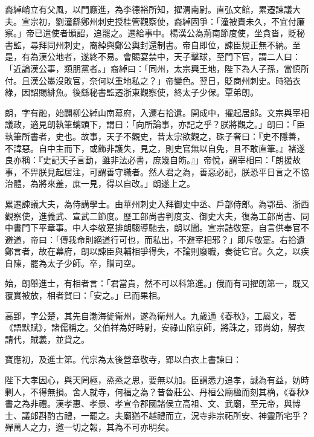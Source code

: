 \begin{pinyinscope}
 裔綽峭立有父風，以門廕進，為李德裕所知，擢渭南尉。直弘文館，累遷諫議大夫。宣宗初，劉潼繇鄭州刺史授桂管觀察使，裔綽固爭：「潼被責未久，不宜付廉察。」帝已遣使者頒詔，追罷之。遷給事中。楊漢公為荊南節度使，坐貪沓，貶秘書監，尋拜同州刺史，裔綽與鄭公輿封還制書。帝自即位，諫臣規正無不納。至是，有為漢公地者，遂終不易。會賜宴禁中，天子擊球，至門下官，謂二人曰：「近論漢公事，類朋黨者。」裔綽曰：「同州，太宗興王地，陛下為人子孫，當慎所付。且漢公墨沒敗官，奈何以重地私之？」帝變色。翌日，貶商州刺史。時猶衣綠，因詔賜緋魚。後繇秘書監遷浙東觀察使，終太子少保。覃弟朗。



 朗，字有融，始闢柳公綽山南幕府，入遷右拾遺。開成中，擢起居郎。文宗與宰相議政，適見朗執筆螭頭下，謂曰：「向所論事，亦記之乎？朕將觀之。」朗曰：「臣執筆所書者，史也。故事，天子不觀史，昔太宗欲觀之，硃子奢曰：『史不隱善，不諱惡。自中主而下，或飾非護失，見之，則史官無以自免，且不敢直筆。』褚遂良亦稱：『史記天子言動，雖非法必書，庶幾自飭。』」帝悅，謂宰相曰：「朗援故事，不畀朕見起居注，可謂善守職者。然人君之為，善惡必記，朕恐平日言之不協治體，為將來羞，庶一見，得以自改。」朗遂上之。



 累遷諫議大夫，為侍講學士。由華州刺史入拜御史中丞、戶部侍郎。為鄂岳、浙西觀察使，進義武、宣武二節度。歷工部尚書判度支、御史大夫，復為工部尚書、同中書門下平章事。中人李敬寔排朗騶導馳去，朗以聞。宣宗詰敬寔，自言供奉官不避道，帝曰：「傳我命則絕道行可也，而私出，不避宰相邪？」即斥敬寔。右拾遺鄭言者，故在幕府，朗以諫臣與輔相爭得失，不論則廢職，奏徙它官。久之，以疾自陳，罷為太子少師。卒，贈司空。



 始，朗舉進士，有相者言：「君當貴，然不可以科第進。」俄而有司擢朗第一，既又覆實被放，相者賀曰：「安之。」已而果相。



 高郢，字公楚，其先自渤海徙衛州，遂為衛州人。九歲通《春秋》，工屬文，著《語默賦》，諸儒稱之。父伯祥為好畤尉，安祿山陷京師，將誅之，郢尚幼，解衣請代，賊義，並貸之。



 寶應初，及進士第。代宗為太後營章敬寺，郢以白衣上書諫曰：



 陛下大孝因心，與天罔極，烝烝之思，要無以加。臣謂悉力追孝，誠為有益，妨時剿人，不得無損。舍人就寺，何福之為？昔魯莊公、丹桓公廟楹而刻其桷，《春秋》書之為非禮。漢孝惠、孝景、孝宣令郡國諸侯立高祖、文、武廟，至元帝，與博士、議郎斟酌古禮，一罷之。夫廟猶不越禮而立，況寺非宗祏所安、神靈所宅乎？殫萬人之力，邀一切之報，其為不可亦明矣。



\end{pinyinscope}
